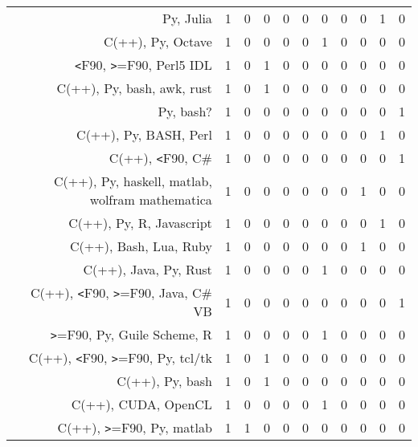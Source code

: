 {\begin{landscape}
\begin{longtable}[htb]{r|c|c|c|c|c|c|c|c|c|c}
{Py, Julia} & 1 & 0 & 0 & 0 & 0 & 0 & 0 & 0 & 1 & 0 \\%
{C(++), Py, Octave} & 1 & 0 & 0 & 0 & 0 & 1 & 0 & 0 & 0 & 0 \\%
{\verb!<!F90, \verb!>!=F90, Perl5 IDL} & 1 & 0 & 1 & 0 & 0 & 0 & 0 & 0 & 0 & 0 \\%
{C(++), Py, bash, awk, rust} & 1 & 0 & 1 & 0 & 0 & 0 & 0 & 0 & 0 & 0 \\%
{Py, bash?} & 1 & 0 & 0 & 0 & 0 & 0 & 0 & 0 & 0 & 1 \\%
{C(++), Py, BASH, Perl} & 1 & 0 & 0 & 0 & 0 & 0 & 0 & 0 & 1 & 0 \\%
{C(++), \verb!<!F90, C\#} & 1 & 0 & 0 & 0 & 0 & 0 & 0 & 0 & 0 & 1 \\%
{C(++), Py, haskell, matlab, wolfram mathematica} & 1 & 0 & 0 & 0 & 0 & 0 & 0 & 1 & 0 & 0 \\%
{C(++), Py, R, Javascript} & 1 & 0 & 0 & 0 & 0 & 0 & 0 & 0 & 1 & 0 \\%
{C(++), Bash, Lua, Ruby} & 1 & 0 & 0 & 0 & 0 & 0 & 0 & 1 & 0 & 0 \\%
{C(++), Java, Py, Rust} & 1 & 0 & 0 & 0 & 0 & 1 & 0 & 0 & 0 & 0 \\%
{C(++), \verb!<!F90, \verb!>!=F90, Java, C\# VB} & 1 & 0 & 0 & 0 & 0 & 0 & 0 & 0 & 0 & 1 \\%
{\verb!>!=F90, Py, Guile Scheme, R} & 1 & 0 & 0 & 0 & 0 & 1 & 0 & 0 & 0 & 0 \\%
{C(++), \verb!<!F90, \verb!>!=F90, Py, tcl/tk} & 1 & 0 & 1 & 0 & 0 & 0 & 0 & 0 & 0 & 0 \\%
{C(++), Py, bash} & 1 & 0 & 1 & 0 & 0 & 0 & 0 & 0 & 0 & 0 \\%
{C(++), CUDA, OpenCL} & 1 & 0 & 0 & 0 & 0 & 1 & 0 & 0 & 0 & 0 \\%
{C(++), \verb!>!=F90, Py, matlab} & 1 & 1 & 0 & 0 & 0 & 0 & 0 & 0 & 0 & 0 \\%
\hline%
\end{longtable}%
\end{landscape}}%
\clearpage%
